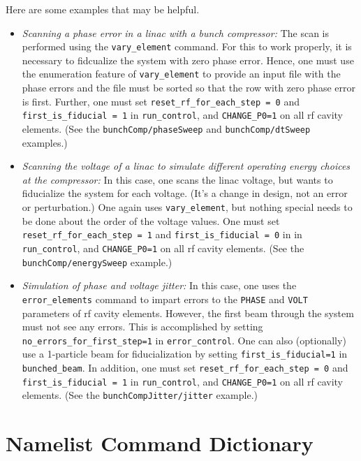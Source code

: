 \documentclass[11pt]{article}
\begin{document}
Here are some examples that may be helpful.  
\begin{itemize}
\item {\em Scanning a phase error in a linac with a bunch compressor:}  The scan is performed using
the \verb|vary_element| command.  For this to work properly, it is necessary to fidcualize the system
with zero phase error.  Hence, one must use the enumeration feature of \verb|vary_element| to provide
an input file with the phase errors and the file must be sorted so that the row with zero phase error
is first.  Further, one must set \verb|reset_rf_for_each_step = 0| and \verb|first_is_fiducial = 1|
in \verb|run_control|, and \verb|CHANGE_P0=1| on all rf cavity elements.  (See the \verb|bunchComp/phaseSweep| 
and \verb|bunchComp/dtSweep| examples.)

\item {\em Scanning the voltage of a linac to simulate different operating energy choices at the compressor:}
In this case, one scans the linac voltage, but wants to fiducialize the system for each voltage.
(It's a change in design, not an error or perturbation.)  One again uses \verb|vary_element|, but
nothing special needs to be done about the order of the voltage values.  One must set
\verb|reset_rf_for_each_step = 1| and \verb|first_is_fiducial = 0| in in \verb|run_control|,
and \verb|CHANGE_P0=1| on all rf cavity elements.  (See the \verb|bunchComp/energySweep| example.)

\item {\em Simulation of phase and voltage jitter:}  In this case, one uses the \verb|error_elements|
command to impart errors to the \verb|PHASE| and \verb|VOLT| parameters of rf cavity elements.
However, the first beam through the system must not see any errors.  This is accomplished by
setting \verb|no_errors_for_first_step=1| in \verb|error_control|.  One can also (optionally) use
a 1-particle beam for fiducialization by setting \verb|first_is_fiducial=1| in \verb|bunched_beam|.
In addition, one must set  \verb|reset_rf_for_each_step = 0| and \verb|first_is_fiducial = 1|
in \verb|run_control|, and \verb|CHANGE_P0=1| on all rf cavity elements.  (See the \verb|bunchCompJitter/jitter|
example.)

\end{itemize}

\section{Namelist Command Dictionary}
\end{document}
